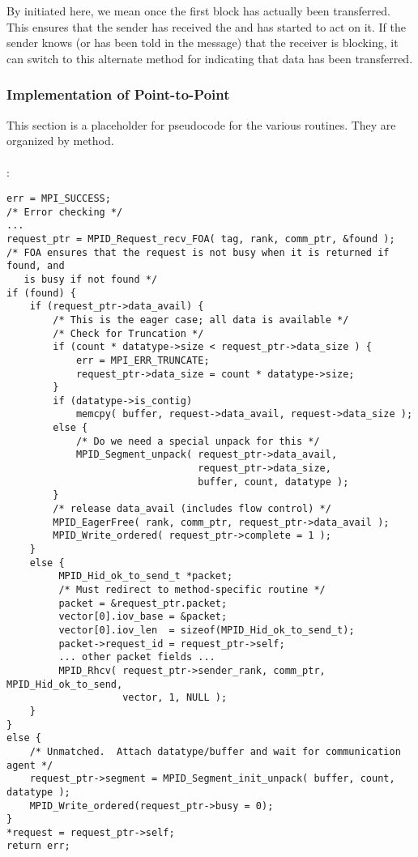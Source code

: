 By initiated here, we mean once the first block has actually been
transferred.  This ensures that the sender has received the
 and has started to act on it.  If the sender
knows (or has been told in the  message) that
the receiver is blocking, it can switch to this alternate method for
indicating that data has been transferred.

\clearpage

\subsubsection{Implementation of Point-to-Point}
This section is a placeholder for pseudocode for the various routines.  They
are organized by method.

\paragraph{\tcpname}
:
\begin{verbatim}
err = MPI_SUCCESS;
/* Error checking */
...
request_ptr = MPID_Request_recv_FOA( tag, rank, comm_ptr, &found );
/* FOA ensures that the request is not busy when it is returned if found, and
   is busy if not found */
if (found) {
    if (request_ptr->data_avail) {
        /* This is the eager case; all data is available */
        /* Check for Truncation */
        if (count * datatype->size < request_ptr->data_size ) {
            err = MPI_ERR_TRUNCATE;
            request_ptr->data_size = count * datatype->size;
        }
        if (datatype->is_contig) 
            memcpy( buffer, request->data_avail, request->data_size );
        else {
            /* Do we need a special unpack for this */
            MPID_Segment_unpack( request_ptr->data_avail, 
                                 request_ptr->data_size, 
                                 buffer, count, datatype );
        }
        /* release data_avail (includes flow control) */
        MPID_EagerFree( rank, comm_ptr, request_ptr->data_avail );
        MPID_Write_ordered( request_ptr->complete = 1 );
    }
    else {
         MPID_Hid_ok_to_send_t *packet;
         /* Must redirect to method-specific routine */
         packet = &request_ptr.packet;
         vector[0].iov_base = &packet;
         vector[0].iov_len  = sizeof(MPID_Hid_ok_to_send_t);
         packet->request_id = request_ptr->self;
         ... other packet fields ...
         MPID_Rhcv( request_ptr->sender_rank, comm_ptr, MPID_Hid_ok_to_send,
                    vector, 1, NULL );
    }
}
else {
    /* Unmatched.  Attach datatype/buffer and wait for communication agent */
    request_ptr->segment = MPID_Segment_init_unpack( buffer, count, datatype );
    MPID_Write_ordered(request_ptr->busy = 0);
}
*request = request_ptr->self;
return err;
\end{verbatim}

